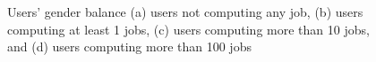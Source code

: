 \documentclass{article}
\begin{document}
\begin{figure}[t]
	\begin{center}
	\end{center}
	\caption{Users' gender balance  (a) users not computing any job, (b) users computing at least 1 jobs, (c) users computing more than 10 jobs, and (d) users computing more than 100 jobs}
	\label{img:genderchallenge}
\end{figure} 
      
\end{document}
